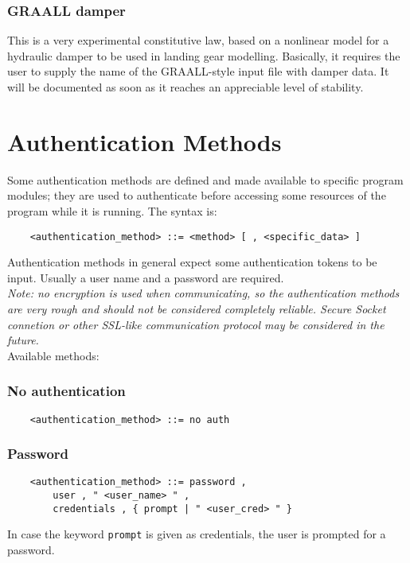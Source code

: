 \subsubsection{GRAALL damper}
This is a very experimental constitutive law, based on a nonlinear model
for a hydraulic damper to be used in landing gear modelling.
Basically, it requires the user to supply the name of the GRAALL-style 
input file with damper data.
It will be documented as soon as it reaches an appreciable level of
stability.



\section{Authentication Methods}
Some authentication methods are defined and made available to specific
program modules; they are used to authenticate before accessing some
resources of the program while it is running.
The syntax is:
\begin{verbatim}
    <authentication_method> ::= <method> [ , <specific_data> ]
\end{verbatim}
Authentication methods in general expect some authentication tokens to be
input.
Usually a user name and a password are required. \\
{\em 
    Note: no encryption is used when communicating, so the authentication
    methods are very rough and should not be considered completely reliable.
    Secure Socket connetion or other SSL-like communication protocol may be
    considered in the future.
} \\
Available methods:
\subsubsection{No authentication}
\begin{verbatim}
    <authentication_method> ::= no auth
\end{verbatim}

\subsubsection{Password}
\begin{verbatim}
    <authentication_method> ::= password ,
        user , " <user_name> " ,
        credentials , { prompt | " <user_cred> " }
\end{verbatim}
In case the keyword \texttt{prompt} is given as credentials, the user is
prompted for a password.


